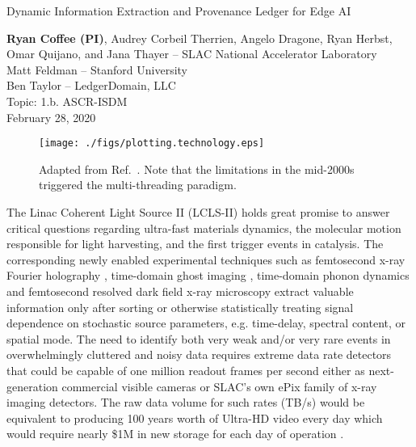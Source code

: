 \documentclass{article}
\begin{document}
\centerline{
\large
Dynamic Information Extraction and Provenance Ledger for Edge AI
}
\normalsize
\begin{centering}
	\textbf{Ryan Coffee (PI)}, Audrey Corbeil Therrien, 
	Angelo Dragone, Ryan Herbst, 
	\\Omar Quijano, 
	and Jana Thayer -- 
	SLAC National Accelerator Laboratory\\
	Matt Feldman -- Stanford University\\
	Ben Taylor -- LedgerDomain, LLC	\\
	Topic: 1.b. ASCR-ISDM\\
	February 28, 2020
\\
\end{centering}
\vspace{\baselineskip}
\begin{wrapfigure}[23]{r}{.4\linewidth}
	\vspace{-1.5\baselineskip}
	\centerline{ \texttt{[image: ./figs/plotting.technology.eps]} }
	\vspace{-1\baselineskip}
	\caption{
		\label{fig::technology} 
		Adapted from Ref.~\cite{MicroprocessorTrendData}. Note that the limitations in the mid-2000s triggered the multi-threading paradigm.
	}
\end{wrapfigure}
The Linac Coherent Light Source II (LCLS-II) holds great promise to answer critical questions regarding ultra-fast materials dynamics, the molecular motion responsible for light harvesting, and the first trigger events in catalysis. 
The corresponding newly enabled experimental techniques such as femtosecond x-ray Fourier holography \cite{Tais2018}, time-domain ghost imaging \cite{Taran2020}, time-domain phonon dynamics \cite{Mariano2013,Abbamonte2013} and femtosecond resolved dark field x-ray microscopy \cite{Simons2015} extract valuable information only after sorting or otherwise statistically treating signal dependence on stochastic source parameters, e.g. time-delay, spectral content, or spatial mode.
The need to identify both very weak and/or very rare events in overwhelmingly cluttered and noisy data requires extreme data rate detectors that could be capable of one million readout frames per second either as next-generation commercial visible cameras or SLAC's own ePix family of x-ray imaging detectors. 
The raw data volume for such rates (TB/s) would be equivalent to producing 100 years worth of Ultra-HD video \cite{HowBigVideo} every day which would require nearly \$1M in new storage for each day of operation \cite{CostPerTB}.
\end{document}
